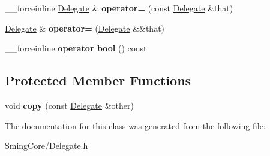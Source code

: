 \begin{DoxyCompactItemize}
\item 
\hypertarget{class_delegate_3_01_return_type_07_params_list_8_8_8_08_4_ab8ff021178b0df1abdf02e4757c45530}{}\+\_\+\+\_\+forceinline \hyperlink{class_delegate}{Delegate} \& {\bfseries operator=} (const \hyperlink{class_delegate}{Delegate} \&that)\label{class_delegate_3_01_return_type_07_params_list_8_8_8_08_4_ab8ff021178b0df1abdf02e4757c45530}

\item 
\hypertarget{class_delegate_3_01_return_type_07_params_list_8_8_8_08_4_ac908c5ef8d31cd1589bdb3a94f8b5eff}{}\hyperlink{class_delegate}{Delegate} \& {\bfseries operator=} (\hyperlink{class_delegate}{Delegate} \&\&that)\label{class_delegate_3_01_return_type_07_params_list_8_8_8_08_4_ac908c5ef8d31cd1589bdb3a94f8b5eff}

\item 
\hypertarget{class_delegate_3_01_return_type_07_params_list_8_8_8_08_4_af757bbda83d6ff9bf7e4b869888cb962}{}\+\_\+\+\_\+forceinline {\bfseries operator bool} () const \label{class_delegate_3_01_return_type_07_params_list_8_8_8_08_4_af757bbda83d6ff9bf7e4b869888cb962}

\end{DoxyCompactItemize}
\subsection*{Protected Member Functions}
\begin{DoxyCompactItemize}
\item 
\hypertarget{class_delegate_3_01_return_type_07_params_list_8_8_8_08_4_ac9ef56d176dd819c6080055f911f5275}{}void {\bfseries copy} (const \hyperlink{class_delegate}{Delegate} \&other)\label{class_delegate_3_01_return_type_07_params_list_8_8_8_08_4_ac9ef56d176dd819c6080055f911f5275}

\end{DoxyCompactItemize}


The documentation for this class was generated from the following file\+:\begin{DoxyCompactItemize}
\item 
Sming\+Core/Delegate.\+h\end{DoxyCompactItemize}
